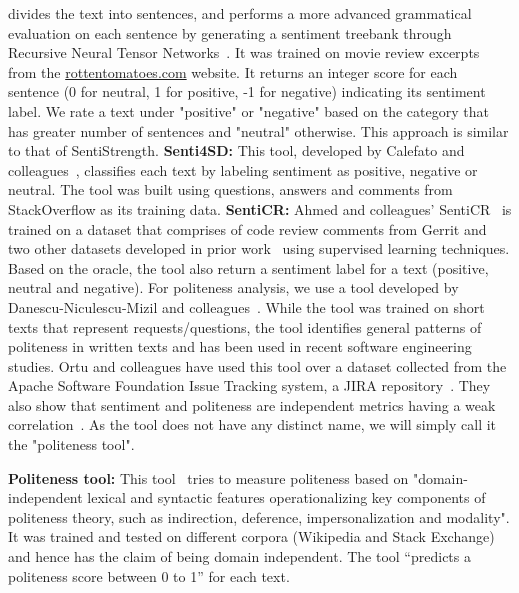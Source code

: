 divides the text into sentences, 
and performs a more advanced grammatical evaluation 
on each sentence 
by generating a sentiment treebank 
through Recursive Neural Tensor Networks~\cite{socher2013recursive}.
It was trained on movie review excerpts 
from the \url{rottentomatoes.com} website. 
It returns an integer score for each sentence 
(0 for neutral, 1 for positive, -1 for negative) 
indicating its sentiment label. 
We rate a text under "positive" or "negative" 
based on the category that has greater number of sentences 
and "neutral" otherwise. 
This approach is similar to that of SentiStrength.
\newline
\indent\textbf{Senti4SD:} This tool, 
developed by Calefato and colleagues~\cite{calefato2017sentiment}, classifies each text by labeling sentiment 
as positive, negative or neutral.
The tool was built using 
questions, answers and comments 
from StackOverflow as its training data. 
\newline
\indent \textbf{SentiCR:} Ahmed and colleagues' SentiCR~\cite{ahmed2017senticr} 
is trained on a dataset 
that comprises of 
code review comments from Gerrit and 
two other datasets developed 
in prior work~\cite{calefato2017sentiment,ortu2016emotional} 
using supervised learning techniques. 
Based on the oracle, 
the tool also return a sentiment label 
for a text 
(positive, neutral and negative).
\newline
\newline
For politeness analysis, we use a tool developed by Danescu-Nicu\-lescu-Mizil and colleagues~\cite{danescu2013computational}. 
While the tool was trained on short texts 
that represent requests/questions, 
the tool identifies general patterns of politeness 
in written texts and 
has been used in recent software engineering studies.
Ortu and colleagues have used this tool 
over a dataset collected from 
the Apache Software Foundation Issue Tracking system, 
a JIRA repository~\cite{ortu2015would,ortu2015bullies}. 
They also show that sentiment and politeness 
are independent metrics having a weak correlation~\cite{ortu2015bullies}. 
As the tool does not have any distinct name, 
we will simply call it the "politeness tool". 

\textbf{Politeness tool:} This tool~\cite{danescu2013computational} tries to measure politeness based on 
"domain-independent lexical and syntactic features 
operationalizing key components of politeness theory, 
such as indirection, deference, impersonalization and modality". 
It was trained and tested 
on different corpora (Wikipedia and Stack Exchange) 
and hence has the claim of being domain independent. 
The tool ``predicts a politeness score between 0 to 1'' 
for each text.   

